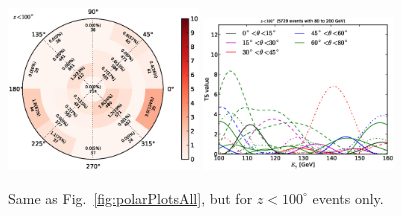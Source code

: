 \documentclass[aps,twocolumn,prd,superscriptaddress,showpacs,nofootinbib,fixfloat]{revtex4}
\begin{document}
\begin{figure}[p]
  \centering
  \includegraphics[width=0.45\textwidth]{plots/polar_z.LE.100.eps}
  \includegraphics[width=0.45\textwidth]{plots/scan_z.LE.100.eps}
  \caption{Same as Fig.~\ref{fig:polarPlotsAll}, but for $z<100^\circ$ events
  only.}
  \label{fig:polarPlots100}
\end{figure}


\end{document}
